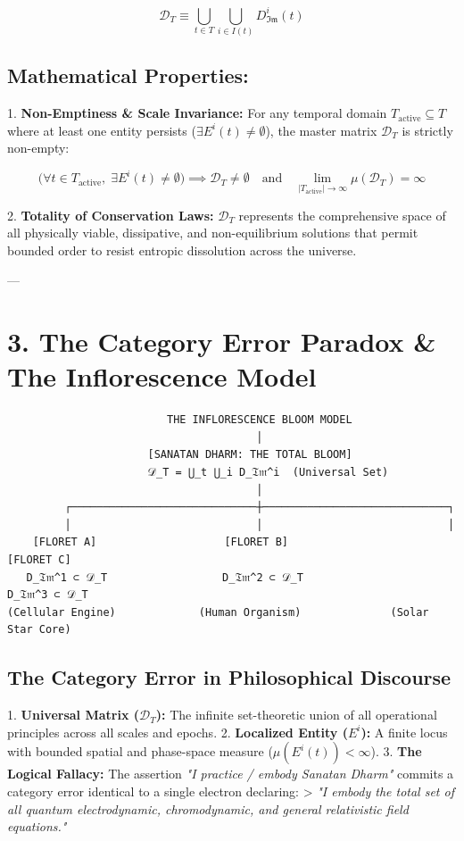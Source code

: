 \documentclass[11pt,a4paper]{article}
\theoremstyle{definition}
\theoremstyle{remark}
\begin{document}
\begin{equation}
\boxed{\mathcal{D}_T \equiv \bigcup_{t \in T} \bigcup_{i \in I(t)} D_{\mathfrak{Im}}^i(t)}
\end{equation}


\subsection{Mathematical Properties:}
1. \textbf{Non-Emptiness \& Scale Invariance:}  
   For any temporal domain $T_{\text{active}} \subseteq T$ where at least one entity persists ($\exists E^i(t) \neq \emptyset$), the master matrix $\mathcal{D}_T$ is strictly non-empty:
   
\begin{equation}
\Big( \forall t \in T_{\text{active}}, \; \exists E^i(t) \neq \emptyset \Big) \implies \mathcal{D}_T \neq \emptyset \quad \text{and} \quad \lim_{|T_{\text{active}}| \to \infty} \mu(\mathcal{D}_T) = \infty
\end{equation}

2. \textbf{Totality of Conservation Laws:}  
   $\mathcal{D}_T$ represents the comprehensive space of all physically viable, dissipative, and non-equilibrium solutions that permit bounded order to resist entropic dissolution across the universe.

---

\section{3. The Category Error Paradox \& The Inflorescence Model}

\begin{verbatim}
                         THE INFLORESCENCE BLOOM MODEL
                                       │
                      [SANATAN DHARM: THE TOTAL BLOOM]
                      𝒟_T = ⋃_t ⋃_i D_𝔗𝔪^i  (Universal Set)
                                       │
         ┌─────────────────────────────┼─────────────────────────────┐
         │                             │                             │
    [FLORET A]                    [FLORET B]                    [FLORET C]
   D_𝔗𝔪^1 ⊂ 𝒟_T                  D_𝔗𝔪^2 ⊂ 𝒟_T                  D_𝔗𝔪^3 ⊂ 𝒟_T
(Cellular Engine)             (Human Organism)              (Solar Star Core)
\end{verbatim}

\subsection{The Category Error in Philosophical Discourse}
1. \textbf{Universal Matrix ($\mathcal{D}_T$):} The infinite set-theoretic union of all operational principles across all scales and epochs.
2. \textbf{Localized Entity ($E^i$):} A finite locus with bounded spatial and phase-space measure ($\mu(E^i(t)) < \infty$).
3. \textbf{The Logical Fallacy:} The assertion \textit{"I practice / embody Sanatan Dharm"} commits a category error identical to a single electron declaring:
   > \textit{"I embody the total set of all quantum electrodynamic, chromodynamic, and general relativistic field equations."}
\end{document}
